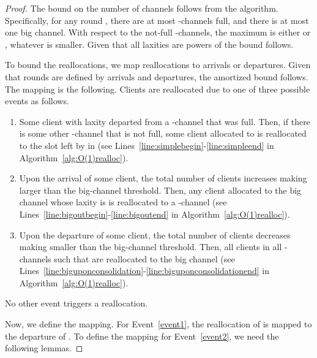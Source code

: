 \begin{proof}
The bound on the number of channels follows from the algorithm. Specifically, for any round , there are at most  -channels full, and there is at most one big channel. With respect to the not-full -channels, the maximum  is either  or , whatever is smaller. Given that all laxities are powers of  the bound follows.

To bound the reallocations, we map reallocations to arrivals or departures. Given that rounds are defined by arrivals and departures, the amortized bound follows. The mapping is the following. Clients are reallocated due to one of three possible events as follows. 

\begin{enumerate}
\item\label{event1}
Some client  with laxity  departed from a -channel  that was full. Then, if there is some other -channel  that is not full, some client  allocated to  is reallocated to the slot left by  in  (see Lines~\ref{line:simplebegin}-\ref{line:simpleend} in Algorithm~\ref{alg:O(1)realloc}). 
\item\label{event2}
Upon the arrival of some client, the total number of clients  increases making  larger than the big-channel threshold. Then, any client  allocated to the big channel whose laxity is  is reallocated to a -channel (see Lines~\ref{line:bigoutbegin}-\ref{line:bigoutend} in Algorithm~\ref{alg:O(1)realloc}). 
\item\label{event3}
Upon the departure of some client, the total number of clients  decreases making  smaller than the big-channel threshold. Then, all clients in all -channels such that  are reallocated to the big channel (see Lines~\ref{line:biguponconsolidation}-\ref{line:biguponconsolidationend} in Algorithm~\ref{alg:O(1)realloc}). 
\end{enumerate}
No other event triggers a reallocation. 

Now, we define the mapping. For Event~\ref{event1}, the reallocation of  is mapped to the departure of . To define the mapping for Event~\ref{event2}, we need the following lemmas.


\end{proof}
